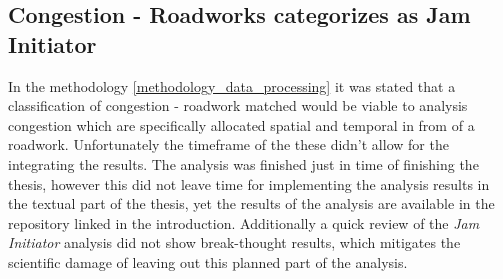 \subsection{Congestion - Roadworks categorizes as Jam Initiator}
\label{analysis_processing_correlation_arbis_initiator}
In the methodology \cref{methodology_data_processing} it was stated that a classification of congestion - roadwork matched would be viable to analysis congestion which are specifically allocated spatial and temporal in from of a roadwork. Unfortunately the timeframe of the these didn't allow for the integrating the results. The analysis was finished just in time of finishing the thesis, however this did not leave time for implementing the analysis results in the textual part of the thesis, yet the results of the analysis are available in the repository linked in the introduction. Additionally a quick review of the \textit{Jam Initiator} analysis did not show break-thought results, which mitigates the scientific damage of leaving out this planned part of the analysis.